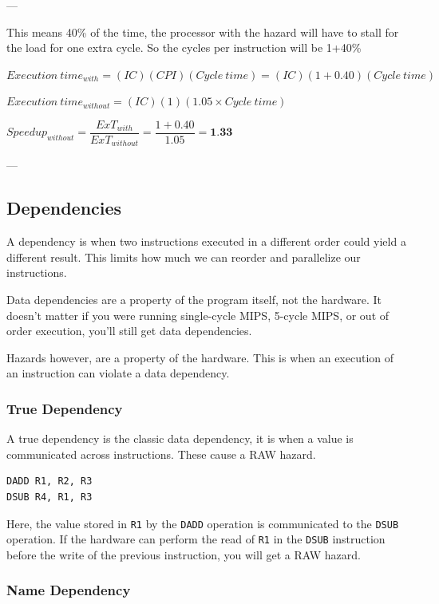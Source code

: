 \documentclass{article}
\begin{document}
---

This means 40\% of the time, the processor with the hazard will have to stall for the load for one extra cycle. So the cycles per instruction will be 1+40\%

$Execution\ time_{with} = (IC)(CPI)(Cycle\ time) = (IC)(1 + 0.40)(Cycle\ time)$

$Execution\ time_{without} = (IC)(1)(1.05 \times Cycle\ time)$

$Speedup_{without} = \dfrac{ExT_{with}}{ExT_{without}} = \dfrac{1+0.40}{1.05} = \textbf{1.33}$

---

\subsection{Dependencies}

A dependency is when two instructions executed in a different order could yield a different result. This limits how much we can reorder and parallelize our instructions.

Data dependencies are a property of the program itself, not the hardware. It doesn't matter if you were running single-cycle MIPS, 5-cycle MIPS, or out of order execution, you'll still get data dependencies. 

Hazards however, are a property of the hardware. This is when an execution of an instruction can violate a data dependency. 

\subsubsection{True Dependency}

A true dependency is the classic data dependency, it is when a value is communicated across instructions. These cause a RAW hazard.

\begin{Verbatim}
DADD R1, R2, R3
DSUB R4, R1, R3
\end{Verbatim}

Here, the value stored in \texttt{R1} by the \texttt{DADD} operation is communicated to the \texttt{DSUB} operation. If the hardware can perform the read of \texttt{R1} in the \texttt{DSUB} instruction before the write of the previous instruction, you will get a RAW hazard.

\subsubsection{Name Dependency}
\end{document}
